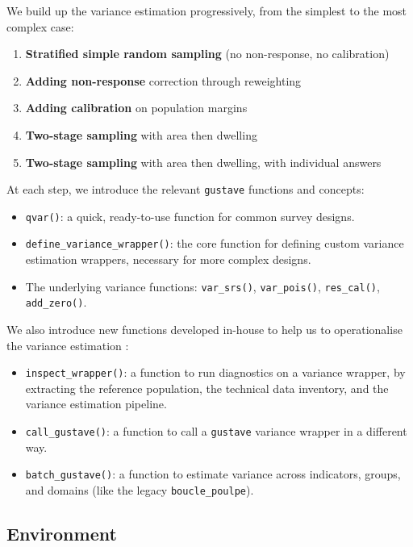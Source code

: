 \documentclass[
]{article}
\providecommand{\tightlist}{%
  \setlength{\itemsep}{0pt}\setlength{\parskip}{0pt}}
\begin{document}
We build up the variance estimation progressively, from the simplest to
the most complex case:

\begin{enumerate}
\def\labelenumi{\arabic{enumi}.}
\tightlist
\item
  \textbf{Stratified simple random sampling} (no non-response, no
  calibration)
\item
  \textbf{Adding non-response} correction through reweighting
\item
  \textbf{Adding calibration} on population margins
\item
  \textbf{Two-stage sampling} with area then dwelling
\item
  \textbf{Two-stage sampling} with area then dwelling, with individual
  answers
\end{enumerate}

At each step, we introduce the relevant \texttt{gustave} functions and
concepts:

\begin{itemize}
\tightlist
\item
  \texttt{qvar()}: a quick, ready-to-use function for common survey
  designs.
\item
  \texttt{define\_variance\_wrapper()}: the core function for defining
  custom variance estimation wrappers, necessary for more complex
  designs.
\item
  The underlying variance functions: \texttt{var\_srs()},
  \texttt{var\_pois()}, \texttt{res\_cal()}, \texttt{add\_zero()}.
\end{itemize}

We also introduce new functions developed in-house to help us to
operationalise the variance estimation :

\begin{itemize}
\tightlist
\item
  \texttt{inspect\_wrapper()}: a function to run diagnostics on a
  variance wrapper, by extracting the reference population, the
  technical data inventory, and the variance estimation pipeline.
\item
  \texttt{call\_gustave()}: a function to call a \texttt{gustave}
  variance wrapper in a different way.
\item
  \texttt{batch\_gustave()}: a function to estimate variance across
  indicators, groups, and domains (like the legacy
  \texttt{boucle\_poulpe}).
\end{itemize}

\subsection{Environment}\label{environment}
\end{document}

